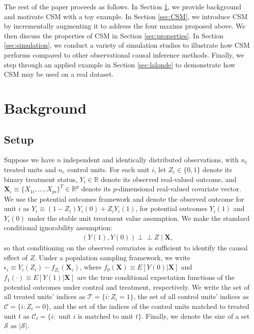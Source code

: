 \documentclass{article}
\newcommand{\bX}{\mathbf{X}}
\newcommand{\R}{\mathbb{R}}
\newcommand{\Rp}{\mathbb{R}^p}
\newcommand{\Ct}{\mathcal{C}_{t}}
\newcommand{\indep}{\perp \!\!\! \perp}
\begin{document}
The rest of the paper proceeds as follows.
In Section \ref{sec:background}, we provide background and motivate CSM with a toy example.
In Section \ref{sec:CSM}, we introduce CSM by incrementally augmenting it to address the four maxims proposed above.
We then discuss the properties of CSM in Section \ref{sec:properties}.
In Section \ref{sec:simulation}, we conduct a variety of simulation studies to illustrate how CSM performs compared to other observational causal inference methods.
Finally, we step through an applied example in Section \ref{sec:lalonde} to demonstrate how CSM may be used on a real dataset.


\section{Background}
\label{sec:background}

\subsection{Setup}

Suppose we have $n$ independent and identically distributed observations, with $n_t$ treated units and $n_c$ control units.
For each unit $i$, let $Z_i \in \{0,1\}$ denote its binary treatment status, $Y_i \in \R$ denote its observed real-valued outcome, and $\mathbf{X}_i \equiv \{X_{1i}, \dots, X_{pi} \}^T \in \Rp$ denote its $p$-dimensional real-valued covariate vector.
We use the potential outcomes framework and denote the observed outcome for unit $i$ as $Y_i \equiv (1-Z_i) Y_i(0) + Z_i Y_i(1)$, for potential outcomes $Y_i(1)$ and $Y_i(0)$ under the stable unit treatment value assumption.
We make the standard conditional ignorability assumption:
\begin{align*}
    (Y(1), Y(0)) \indep Z \mid \bX,
\end{align*}
so that conditioning on the observed covariates is sufficient to identify the causal effect of $Z$.
Under a population sampling framework, we write $\epsilon_i \equiv Y_i(Z_i) - f_{Z_i}(\bX_i)$, where $f_0(\bX) \equiv E[Y(0) | \bX]$ and $f_1(\cdot) \equiv E[Y(1) | \bX]$ are the true conditional expectation functions of the potential outcomes under control and treatment, respectively.
We write the set of all treated units' indices as $\mathcal{T} = \{i: Z_i=1\}$, the set of all control units' indices as $\mathcal{C} = \{i: Z_i=0\}$, and the set of the indices of the control units matched to treated unit $t$ as $\Ct = \{i: \text{ unit } i \text{ is matched to unit } t\}$.
Finally, we denote the size of a set $\mathcal{S}$ as $|\mathcal{S}|$.
\end{document}

